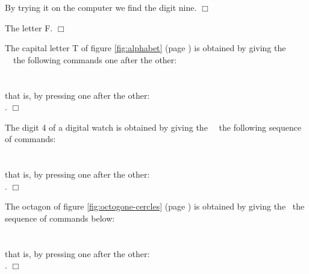 \begin{corrige}{
By trying it on the computer we find the digit nine.
$\Box$}\end{corrige}

\begin{corrige}{
The letter F.
$\Box$}\end{corrige}

\begin{corrige}{
The capital letter T of figure \ref{fig:alphabet} (page \pageref{fig:alphabet}) is
obtained by giving the \robot\ \robotCbN\ the following commands one after the other:\\
\hspace*{2ex}{\idt fd();\ fd();\ fd();\ fd();\ qtr();\ fd()}\\
\hspace*{2ex}{\idt qtr();\ qtr();\ fd();\ fd()}\\
that is, by pressing one after the \hbox{other:}\\
\hspace*{2ex}    \touche{$+$}  \touche{$+$} \touche{$+$}
 .
$\Box$}\end{corrige}

\begin{corrige}{
The digit 4 of a digital watch is
obtained by giving the \robot\ \robotCbN\ the following sequence of commands:\\
\hspace*{2ex}{\idt fd();\ fd();\ qtr();\ qtr();\ fd()}\\
\hspace*{2ex}{\idt qtr();\ fd();\ qtr();\ fd()}\\
that is, by pressing one after the \hbox{other:}\\
\hspace*{2ex}  \touche{$+$} \touche{$+$}  \touche{$+$}  \touche{$+$} .
$\Box$}\end{corrige}

\begin{corrige}{
The octagon of figure \ref{fig:octogone-cercles} (page \pageref{fig:octogone-cercles})
is obtained by giving the \robot\ the sequence of commands below:\\
\hspace*{2ex}{\idt fd();\ etr();\ fd();\ etr();\ fd();\ etr();\ fd();\ etr()}\\
\hspace*{2ex}{\idt fd();\ etr();\ fd();\ etr();\ fd();\ etr();\ fd()}\\
that is, by pressing one after the \hbox{other:}\\
\hspace*{2ex}     
     
  .
$\Box$}\end{corrige}

